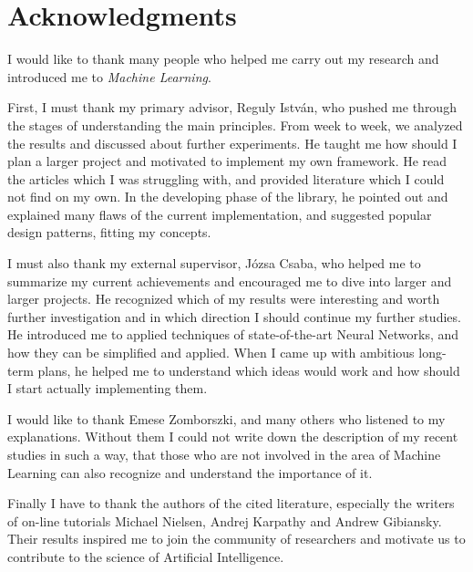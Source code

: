 \chapter*{Acknowledgments}
I would like to thank many people who helped me carry out my research and 
introduced me to \emph{Machine Learning}.

First, I must thank my primary advisor, Reguly István, who pushed me through the stages of understanding the main principles. 
From week to week, we analyzed the results and discussed about further experiments.
He taught me how should I plan a larger project and motivated to implement my own framework.
He read the articles which I was struggling with, and provided literature which I could not find on my own.
In the developing phase of the library, he pointed out and explained many flaws of the current implementation, and suggested popular design patterns, fitting my concepts.

I must also thank my external supervisor, Józsa Csaba, who helped me to summarize my current achievements and encouraged me to dive into larger and larger projects.
He recognized which of my results were interesting and worth further investigation and in which direction I should continue my further studies.
He introduced me to applied techniques of state-of-the-art Neural Networks, and how they can be simplified and applied.
When I came up with ambitious long-term plans, he helped me to understand which ideas would work and how should I start actually implementing them.

I would like to thank Emese Zomborszki, and many others who listened to my explanations.
Without them I could not write down the description of my recent studies in such a way,
that those who are not involved in the area of Machine Learning can also recognize and understand the importance of it.

Finally I have to thank the authors of the cited literature,
especially the writers of on-line tutorials Michael Nielsen, Andrej Karpathy and Andrew Gibiansky.
Their results inspired me to join the community of researchers and motivate us to contribute to the science of Artificial Intelligence.